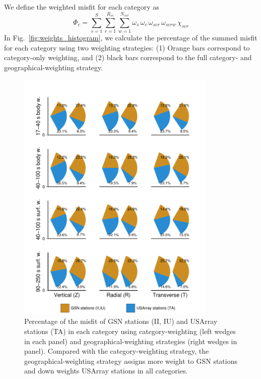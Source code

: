 We define the weighted misfit for each category as
\begin{equation}
\Phi_{c} = \sum_{s=1}^{S} \sum_{r=1}^{R_{sc}} \sum_{w=1}^{N_{scr}} \omega_s\, \omega_{c} \,\omega_{scr}\, \omega_{scrw}\, \chi_{scr}
\end{equation}
In Fig.~\ref{fig:weights_histogram}, we calculate the percentage of the summed misfit for each category 
using two weighting strategies: (1) Orange bars correspond to category-only weighting, and (2) black bars correspond to the full category- and geographical-weighting strategy.

\begin{figure}
\centering
\includegraphics[width=0.85\textwidth]{ch-weighting/figures/category_sta_misfit_contribution.pdf}
  \caption[Percentage of the misfit of GSN stations and USArray stations]
  {\small{Percentage of the misfit of GSN stations (II, IU) and USArray stations (TA)
in each category using category-weighting (left wedges in each panel) and geographical-weighting
strategies (right wedges in panel).
Compared with the category-weighting strategy, the geographical-weighting 
strategy assigns more weight to GSN stations and down weights USArray stations in all categories.
}}
\label{fig:weights_contribution_sta}
\end{figure}

